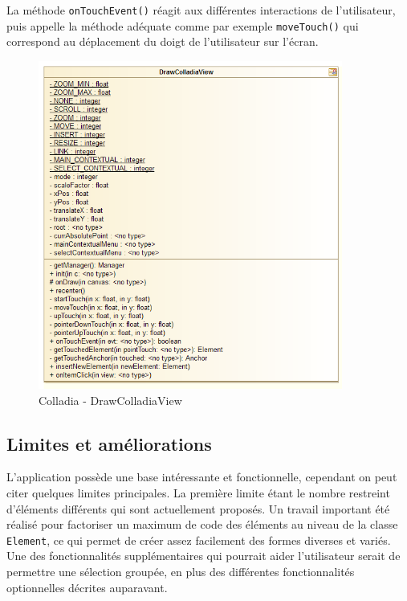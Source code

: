 La méthode \lstinline$onTouchEvent()$ réagit aux différentes interactions de l'utilisateur, puis appelle la méthode adéquate comme par exemple \lstinline$moveTouch()$ qui correspond au déplacement du doigt de l'utilisateur sur l'écran.  
	\begin{figure}[!h]
		\centering
		\includegraphics[width=10cm]{img/UmlDrawView}
		\caption{Colladia - DrawColladiaView}
	\end{figure}

\subsection{Limites et améliorations}
L'application possède une base intéressante et fonctionnelle, cependant on peut citer quelques limites principales.
La première limite étant le nombre restreint d'éléments différents qui sont actuellement proposés. Un travail important été réalisé pour factoriser un maximum de code des éléments au niveau de la classe \lstinline$Element$, ce qui permet de créer assez facilement des formes diverses et variés.
Une des fonctionnalités supplémentaires qui pourrait aider l'utilisateur serait de permettre une sélection groupée, en plus des différentes fonctionnalités optionnelles décrites auparavant. 